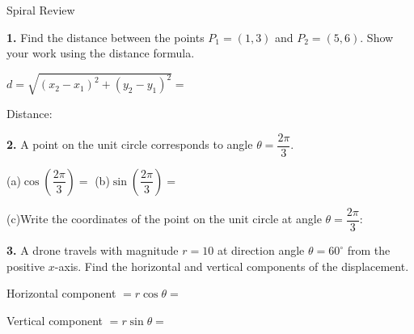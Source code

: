 \documentclass[10pt]{article}
\begin{document}
\namedateperiod

\vspace{0.12in}

\begin{notesbox}{Spiral Review}
\small

\textbf{1.} Find the distance between the points $P_1 = (1, 3)$ and $P_2 = (5, 6)$.
Show your work using the distance formula.

\vspace{0.08in}
\hspace{1em} $d = \sqrt{(x_2 - x_1)^2 + (y_2 - y_1)^2} = $ \blank{6cm}

\vspace{0.12in}
\hspace{1em} Distance: \blank{3cm}

\vspace{0.22in}

\textbf{2.} A point on the unit circle corresponds to angle $\theta = \dfrac{2\pi}{3}$.

\vspace{0.08in}
\hspace{1em} (a)\quad $\cos\!\left(\dfrac{2\pi}{3}\right) = $ \blank{2.5cm}
\qquad
(b)\quad $\sin\!\left(\dfrac{2\pi}{3}\right) = $ \blank{2.5cm}

\vspace{0.18in}
\hspace{1em} (c)\quad Write the coordinates of the point on the unit circle at
angle $\theta = \dfrac{2\pi}{3}$: \blank{3cm}

\vspace{0.22in}

\textbf{3.} A drone travels with magnitude $r = 10$ at direction angle
$\theta = 60^\circ$ from the positive $x$-axis.
Find the horizontal and vertical components of the displacement.

\vspace{0.08in}
\hspace{1em} Horizontal component $= r\cos\theta = $ \blank{5cm}

\vspace{0.1in}
\hspace{1em} Vertical component $= r\sin\theta = $ \blank{5cm}

\end{notesbox}
\end{document}
